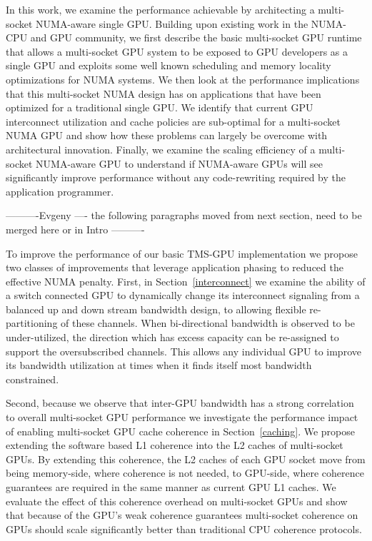 In this work, we examine the performance achievable by architecting a 
multi-socket NUMA-aware single GPU.  Building upon existing work in the 
NUMA-CPU and GPU community, we first describe the basic multi-socket GPU runtime 
that allows a multi-socket GPU system to be exposed to GPU developers as a 
single GPU and exploits some well known scheduling and memory locality 
optimizations for NUMA systems. We then look at the performance implications 
that this multi-socket NUMA design has on applications that have been optimized 
for a traditional single GPU.  We identify that current GPU interconnect 
utilization and cache policies are sub-optimal for a multi-socket NUMA GPU and 
show how these problems can largely be overcome with architectural innovation.  
Finally, we examine the scaling efficiency of a multi-socket NUMA-aware GPU to 
understand if NUMA-aware GPUs will see significantly improve performance  
without any code-rewriting required by the application programmer.


----------Evgeny ---- 
the following paragraphs moved from next section, need to be merged here or in
Intro ----------

To improve the performance of our
basic TMS-GPU implementation we propose two classes of improvements that 
leverage application phasing to reduced the effective NUMA penalty.  First, in 
Section~\ref{interconnect} we examine the ability of a switch connected GPU to 
dynamically change its interconnect signaling from a balanced up and down 
stream bandwidth design, to allowing flexible re-partitioning of these channels.  
When bi-directional bandwidth is observed to be under-utilized, the direction 
which has excess capacity can be re-assigned to support the oversubscribed 
channels. This allows any individual GPU to improve its bandwidth utilization at 
times when it finds itself most bandwidth constrained.

Second, because we observe that inter-GPU bandwidth has a strong correlation to
overall multi-socket GPU performance we investigate the performance impact of
enabling multi-socket GPU cache coherence in Section~\ref{caching}.  We propose
extending the software based L1 coherence into the L2 caches of multi-socket
GPUs.  By extending this coherence, the L2 caches of each GPU socket move from
being memory-side, where coherence is not needed, to GPU-side, where coherence
guarantees are required in the same manner as current GPU L1 caches.  We
evaluate the effect of this coherence overhead on multi-socket GPUs and show
that because of the GPU's weak coherence guarantees multi-socket coherence on
GPUs should scale significantly better than traditional CPU coherence
protocols.

